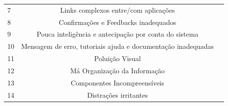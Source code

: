 \begin{table}[H]
\begin{tabular}{|l|c|l|l|l|l|l|}
		7                        & \multicolumn{5}{c|}{Links   complexos entre/com aplicações}                                                &                                                                                                                                                        \\ \cline{1-6}
		8                        & \multicolumn{5}{c|}{Confirmações   e Feedbacks inadequados}                                                &                                                                                                                                                        \\ \cline{1-6}
		9                        & \multicolumn{5}{c|}{Pouca   inteligência e antecipação por conta do sistema}                               &                                                                                                                                                        \\ \cline{1-6}
		10                       & \multicolumn{5}{c|}{Mensagem   de erro, tutoriais ajuda e documentação inadequadas}                        &                                                                                                                                                        \\ \cline{1-6}
		\multicolumn{1}{|c|}{11} & \multicolumn{5}{c|}{Poluição Visual}                                                                       &                                                                                                                                                        \\ \cline{1-6}
		\multicolumn{1}{|c|}{12} & \multicolumn{5}{c|}{Má Organização da Informação}                                                          &                                                                                                                                                        \\ \cline{1-6}
		\multicolumn{1}{|c|}{13} & \multicolumn{5}{c|}{Componentes Incompreensíveis}                                                          &                                                                                                                                                        \\ \cline{1-6}
		\multicolumn{1}{|c|}{14} & \multicolumn{5}{c|}{Distrações irritantes}                                                                 &                                                                                                                                                        \\ \cline{1-6}

\end{tabular}
\end{table}
